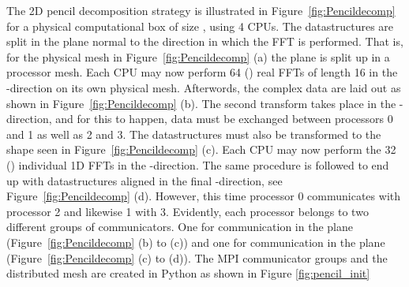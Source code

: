 \documentclass[final,3p,times,twocolumn]{elsarticle}
\begin{document}
\begin{figure*}[th!]
\centering
{}
\caption{2D pencil decomposition of physical mesh  and the three wavenumber meshes , , . The decomposition shown uses 4 CPUs, two in each direction normal to the direction of the current one-dimensional FFT. The FFT in the -direction transforms the real data in  to the complex data in . The data is then transformed and communicated to the composition seen in . Here the FFT in -direction is carried out before the data is transformed again and communicated to , where the final FFT is performed.}
\label{fig:Pencildecomp}
\end{figure*}

The 2D pencil decomposition strategy is illustrated in 
Figure~\ref{fig:Pencildecomp} for a physical computational box of size , 
using 4 CPUs. The datastructures are split in the plane normal to the direction 
in which the FFT is performed. That is, for the physical mesh in 
Figure~\ref{fig:Pencildecomp} (a) the  plane is split up in a  
processor mesh. Each CPU may now perform 64 () real FFTs of 
length 16 in the -direction on its own  physical mesh. 
Afterwords, the complex data are laid out as shown in 
Figure~\ref{fig:Pencildecomp} (b). The second transform takes place in the 
-direction, and for this to happen, data must be exchanged between 
processors 0 and 1 as well as 2 and 3. The datastructures must also be 
transformed to the shape seen in Figure~\ref{fig:Pencildecomp} (c). Each CPU 
may now perform the 32 () individual 1D FFTs in the -direction. 
The same procedure is followed to end up with datastructures aligned in the 
final -direction, see Figure~\ref{fig:Pencildecomp} (d). However, this time 
processor 0 communicates with processor 2 and likewise 1 with 3. Evidently, 
each processor belongs to two different groups of communicators. One for 
communication in the  plane (Figure~\ref{fig:Pencildecomp} (b) to (c)) and 
one for communication in the  plane (Figure~\ref{fig:Pencildecomp} (c) to 
(d)). The MPI communicator groups and the distributed mesh are created in 
Python as shown in Figure \ref{fig:pencil_init}
\end{document}
